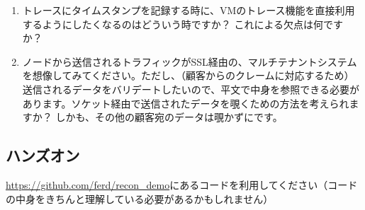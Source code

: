 \begin{enumerate}
	\item トレースにタイムスタンプを記録する時に、VMのトレース機能を直接利用するようにしたくなるのはどういう時ですか？ これによる欠点は何ですか？

	\item ノードから送信されるトラフィックがSSL経由の、マルチテナントシステムを想像してみてください。ただし、（顧客からのクレームに対応するため）送信されるデータをバリデートしたいので、平文で中身を参照できる必要があります。ソケット経由で送信されたデータを覗くための方法を考えられますか？ しかも、その他の顧客宛のデータは覗かずにです。
\end{enumerate}

\subsection*{ハンズオン}

\href{https://github.com/ferd/recon\_demo}{https://github.com/ferd/recon\_demo}にあるコードを利用してください（コードの中身をきちんと理解している必要があるかもしれません）

